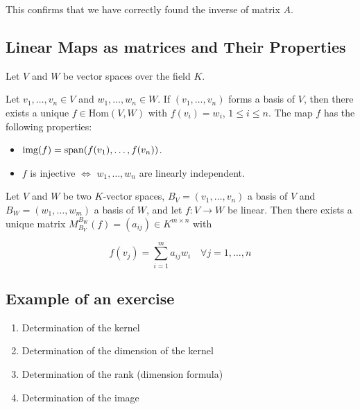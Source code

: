 This confirms that we have correctly found the inverse of matrix \(A\).

\subsection{Linear Maps as matrices and Their Properties}

Let \(V\) and \(W\) be vector spaces over the field \(K\).

Let \(v_1, \dots, v_n \in V\) and \(w_1, \dots, w_n \in W\). If \((v_1, \dots, v_n)\) 
forms a basis of \(V\), then there exists a unique \(f \in \text{Hom}(V, W)\) with 
\(f(v_i) = w_i\), \(1 \leq i \leq n\). The map \(f\) has the following properties:

\begin{itemize}
    
    \item \(\text{img}(f) = \text{span}(f(v_1), \dots, f(v_n))\).

    \item \(f\) is injective \(\Leftrightarrow\) \(w_1, \dots, w_n\) are linearly independent.

\end{itemize}

Let \(V\) and \(W\) be two \(K\)-vector spaces, \(B_V = (v_1, \dots, v_n)\) a basis of \(V\) and \(B_W = (w_1, \dots, w_m)\) a basis of \(W\), and let \(f : V \rightarrow W\) be linear. Then there exists a unique matrix \(M_{B_V}^{B_W}(f) = (a_{ij}) \in K^{m \times n}\) with

\[
    f(v_j) = \sum_{i=1}^{m} a_{ij}w_i \quad \forall j = 1, \dots, n
\]

\subsection{Example of an exercise}

\begin{enumerate}
    
    \item Determination of the kernel
    
    \item Determination of the dimension of the kernel
    
    \item Determination of the rank (dimension formula)
    
    \item Determination of the image

\end{enumerate}

